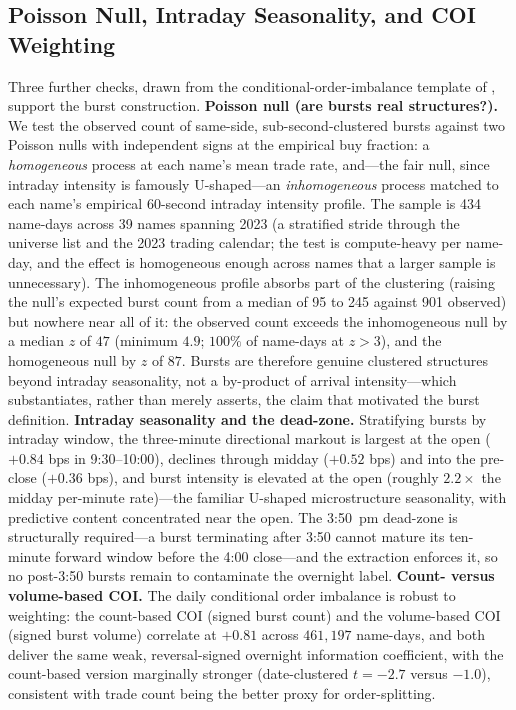 \documentclass[11pt]{article}
\begin{document}
\subsection{Poisson Null, Intraday Seasonality, and COI Weighting}
Three further checks, drawn from the conditional-order-imbalance template of \citet{lrc2024}, support the burst construction. \textbf{Poisson null (are bursts real structures?).} We test the observed count of same-side, sub-second-clustered bursts against two Poisson nulls with independent signs at the empirical buy fraction: a \emph{homogeneous} process at each name's mean trade rate, and---the fair null, since intraday intensity is famously U-shaped---an \emph{inhomogeneous} process matched to each name's empirical 60-second intraday intensity profile. The sample is 434 name-days across 39 names spanning 2023 (a stratified stride through the universe list and the 2023 trading calendar; the test is compute-heavy per name-day, and the effect is homogeneous enough across names that a larger sample is unnecessary). The inhomogeneous profile absorbs part of the clustering (raising the null's expected burst count from a median of 95 to 245 against 901 observed) but nowhere near all of it: the observed count exceeds the inhomogeneous null by a median $z$ of $47$ (minimum $4.9$; $100\%$ of name-days at $z>3$), and the homogeneous null by $z$ of $87$. Bursts are therefore genuine clustered structures beyond intraday seasonality, not a by-product of arrival intensity---which substantiates, rather than merely asserts, the claim that motivated the burst definition. \textbf{Intraday seasonality and the dead-zone.} Stratifying bursts by intraday window, the three-minute directional markout is largest at the open ($+0.84$ bps in 9:30--10:00), declines through midday ($+0.52$ bps) and into the pre-close ($+0.36$ bps), and burst intensity is elevated at the open (roughly $2.2\times$ the midday per-minute rate)---the familiar U-shaped microstructure seasonality, with predictive content concentrated near the open. The 3:50~pm dead-zone is structurally required---a burst terminating after 3:50 cannot mature its ten-minute forward window before the 4:00 close---and the extraction enforces it, so no post-3:50 bursts remain to contaminate the overnight label. \textbf{Count- versus volume-based COI.} The daily conditional order imbalance is robust to weighting: the count-based COI (signed burst count) and the volume-based COI (signed burst volume) correlate at $+0.81$ across $461{,}197$ name-days, and both deliver the same weak, reversal-signed overnight information coefficient, with the count-based version marginally stronger (date-clustered $t=-2.7$ versus $-1.0$), consistent with trade count being the better proxy for order-splitting.
\end{document}
